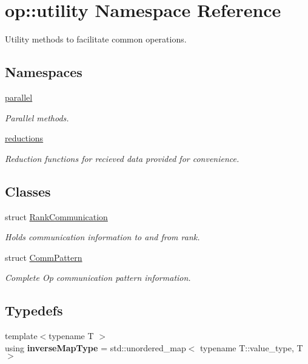 \hypertarget{namespaceop_1_1utility}{\section{op\-:\-:utility Namespace Reference}
\label{namespaceop_1_1utility}
}


Utility methods to facilitate common operations.  


\subsection*{Namespaces}
\begin{DoxyCompactItemize}
\item 
\hyperlink{namespaceop_1_1utility_1_1parallel}{parallel}
\begin{DoxyCompactList}\small\item\em Parallel methods. \end{DoxyCompactList}\item 
\hyperlink{namespaceop_1_1utility_1_1reductions}{reductions}
\begin{DoxyCompactList}\small\item\em Reduction functions for recieved data provided for convenience. \end{DoxyCompactList}\end{DoxyCompactItemize}
\subsection*{Classes}
\begin{DoxyCompactItemize}
\item 
struct \hyperlink{structop_1_1utility_1_1RankCommunication}{Rank\-Communication}
\begin{DoxyCompactList}\small\item\em Holds communication information to and from rank. \end{DoxyCompactList}\item 
struct \hyperlink{structop_1_1utility_1_1CommPattern}{Comm\-Pattern}
\begin{DoxyCompactList}\small\item\em Complete Op communication pattern information. \end{DoxyCompactList}\end{DoxyCompactItemize}
\subsection*{Typedefs}
\begin{DoxyCompactItemize}
\item 
\hypertarget{namespaceop_1_1utility_a26d1f399d036d949cd0a45bc26736a8c}{{\footnotesize template$<$typename T $>$ }\\using {\bfseries inverse\-Map\-Type} = std\-::unordered\-\_\-map$<$ typename T\-::value\-\_\-type, T $>$}\label{namespaceop_1_1utility_a26d1f399d036d949cd0a45bc26736a8c}

\end{DoxyCompactItemize}
